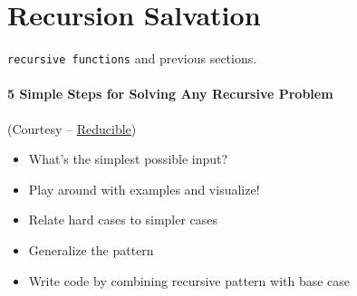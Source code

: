 \section{Recursion Salvation}
\begin{topics}
\verb!recursive functions! and previous sections.
\end{topics}
\paragraph{5 Simple Steps for Solving Any Recursive Problem}
(Courtesy -- \href{https://youtu.be/ngCos392W4w}{Reducible})
\begin{itemize}
	\item What's the simplest possible input?
	\item Play around with examples and visualize!
	\item Relate hard cases to simpler cases
	\item Generalize the pattern
	\item Write code by combining recursive pattern with base case
\end{itemize}
